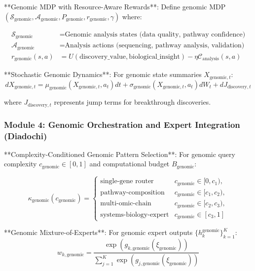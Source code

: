 \documentclass[12pt,a4paper]{article}
\begin{document}
**Genomic MDP with Resource-Aware Rewards**: Define genomic MDP $(\mathcal{S}_{\text{genomic}}, \mathcal{A}_{\text{genomic}}, P_{\text{genomic}}, r_{\text{genomic}}, \gamma)$ where:

\begin{align}
\mathcal{S}_{\text{genomic}} &= \text{Genomic analysis states (data quality, pathway confidence)} \\
\mathcal{A}_{\text{genomic}} &= \text{Analysis actions (sequencing, pathway analysis, validation)} \\
r_{\text{genomic}}(s,a) &= U(\text{discovery\_value}, \text{biological\_insight}) - \eta \mathcal{C}_{\text{analysis}}(s,a)
\end{align}

**Stochastic Genomic Dynamics**: For genomic state summaries $X_{\text{genomic},t}$:
\begin{equation}
dX_{\text{genomic},t} = \mu_{\text{genomic}}(X_{\text{genomic},t}, a_t)dt + \sigma_{\text{genomic}}(X_{\text{genomic},t}, a_t)dW_t + dJ_{\text{discovery},t}
\end{equation}

where $J_{\text{discovery},t}$ represents jump terms for breakthrough discoveries.

\subsubsection{Module 4: Genomic Orchestration and Expert Integration (Diadochi)}

**Complexity-Conditioned Genomic Pattern Selection**: For genomic query complexity $c_{\text{genomic}} \in [0,1]$ and computational budget $B_{\text{genomic}}$:

\begin{equation}
\kappa_{\text{genomic}}(c_{\text{genomic}}) = \begin{cases}
\text{single-gene router} & c_{\text{genomic}} \in [0, c_1), \\
\text{pathway-composition} & c_{\text{genomic}} \in [c_1, c_2), \\
\text{multi-omic-chain} & c_{\text{genomic}} \in [c_2, c_3), \\
\text{systems-biology-expert} & c_{\text{genomic}} \in [c_3, 1]
\end{cases}
\end{equation}

**Genomic Mixture-of-Experts**: For genomic expert outputs $\{h_k^{\text{genomic}}\}_{k=1}^{K}$:
\begin{equation}
w_{k,\text{genomic}} = \frac{\exp(g_{k,\text{genomic}}(\xi_{\text{genomic}}))}{\sum_{j=1}^{K} \exp(g_{j,\text{genomic}}(\xi_{\text{genomic}}))}
\end{equation}
\end{document}
